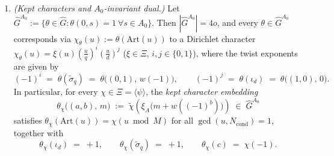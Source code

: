 \begin{proposition}
\begin{enumerate}[label=\textup{(\roman*)}]
\item \emph{(Kept characters and $A_0$-invariant dual.)} Let $\widehat{G}^{A_0} := \{\theta \in \widehat{G} : \theta(0, s) = 1\ \forall s \in A_0\}$. Then $|\widehat{G}^{A_0}| = 4o$, and every $\theta \in \widehat{G}^{A_0}$ corresponds via $\chi_\theta(u) := \theta(\mathrm{Art}(u))$ to a Dirichlet character $\chi_\theta(u) = \xi(u) (\frac{u}{q})^i (\frac{u}{d})^j$ ($\xi \in \Xi$, $i, j \in \{0, 1\}$), where the twist exponents are given by
  \begin{equation}
  \label{eq:03:ij-formula}
    (-1)^i \;=\; \theta(\widetilde{\sigma}_q) \;=\; \theta\bigl((0, 1),\, w(-1)\bigr), \qquad
    (-1)^j \;=\; \theta(\iota_d) \;=\; \theta\bigl((1, 0),\, 0\bigr).
  \end{equation}
  In particular, for every $\chi \in \Xi = \langle \psi \rangle$, the \emph{kept character embedding}
  \begin{equation}
  \label{eq:03:kept-char}
    \theta_\chi\bigl((a, b),\, m\bigr) \;:=\; \widetilde{\chi}\!\left(\xi_A\bigl(m + w((-1)^b)\bigr)\right) \;\in\; \widehat{G}^{A_0}
  \end{equation}
  satisfies $\theta_\chi(\mathrm{Art}(u)) = \chi(u \bmod M)$ for all $\gcd(u, N_{\mathrm{cond}}) = 1$, together with
  \[
    \theta_\chi(\iota_d) \;=\; +1, \qquad \theta_\chi(\widetilde{\sigma}_q) \;=\; +1, \qquad \theta_\chi(c) \;=\; \chi(-1).
  \]
\end{enumerate}
\end{proposition}


